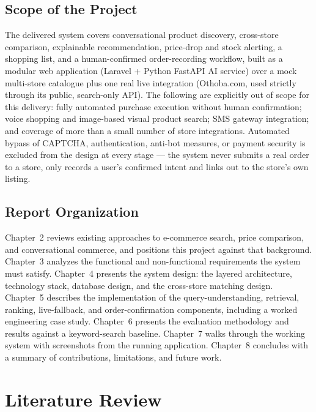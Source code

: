 \documentclass[12pt,a4paper]{report}
\begin{document}
\section{Scope of the Project}
The delivered system covers conversational product discovery, cross-store comparison, explainable
recommendation, price-drop and stock alerting, a shopping list, and a human-confirmed order-recording
workflow, built as a modular web application (Laravel + Python FastAPI AI service) over a mock multi-store
catalogue plus one real live integration (Othoba.com, used strictly through its public, search-only API).
The following are explicitly out of scope for this delivery: fully automated purchase execution without
human confirmation; voice shopping and image-based visual product search; SMS gateway integration; and
coverage of more than a small number of store integrations. Automated bypass of CAPTCHA, authentication,
anti-bot measures, or payment security is excluded from the design at every stage --- the system never
submits a real order to a store, only records a user's confirmed intent and links out to the store's own
listing.

\section{Report Organization}
Chapter~2 reviews existing approaches to e-commerce search, price comparison, and conversational commerce,
and positions this project against that background. Chapter~3 analyzes the functional and non-functional
requirements the system must satisfy. Chapter~4 presents the system design: the layered architecture,
technology stack, database design, and the cross-store matching design. Chapter~5 describes the
implementation of the query-understanding, retrieval, ranking, live-fallback, and order-confirmation
components, including a worked engineering case study. Chapter~6 presents the evaluation methodology and
results against a keyword-search baseline. Chapter~7 walks through the working system with screenshots
from the running application. Chapter~8 concludes with a summary of contributions, limitations, and future
work.

\chapter{Literature Review}
\end{document}
